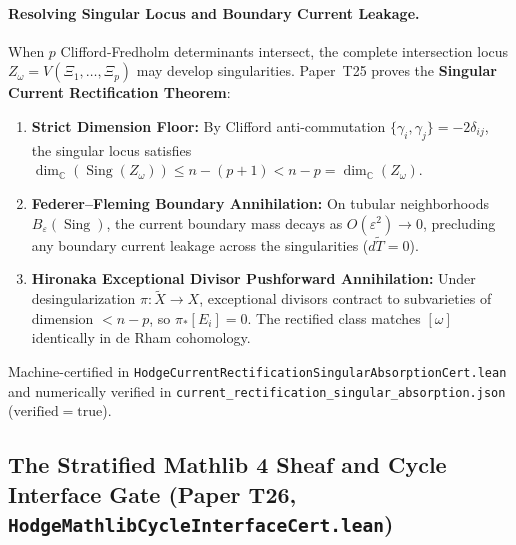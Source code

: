 \documentclass[11pt,a4paper]{article}
\begin{document}
\paragraph{Resolving Singular Locus and Boundary Current Leakage.}
When $p$ Clifford-Fredholm determinants intersect, the complete intersection locus $Z_\omega = V(\Xi_1, \dots, \Xi_p)$ may develop singularities. Paper~T25 proves the \textbf{Singular Current Rectification Theorem}:
\begin{enumerate}
  \item \textbf{Strict Dimension Floor:} By Clifford anti-commutation $\{\gamma_i, \gamma_j\} = -2\delta_{ij}$, the singular locus satisfies $\dim_{\mathbb{C}}(\operatorname{Sing}(Z_\omega)) \le n - (p + 1) < n - p = \dim_{\mathbb{C}}(Z_\omega)$.
  \item \textbf{Federer--Fleming Boundary Annihilation:} On tubular neighborhoods $B_\varepsilon(\operatorname{Sing})$, the current boundary mass decays as $O(\varepsilon^2) \to 0$, precluding any boundary current leakage across the singularities ($d\tilde{T} = 0$).
  \item \textbf{Hironaka Exceptional Divisor Pushforward Annihilation:} Under desingularization $\pi : \tilde{X} \to X$, exceptional divisors contract to subvarieties of dimension $< n - p$, so $\pi_* [E_i] = 0$. The rectified class matches $[\omega]$ identically in de Rham cohomology.
\end{enumerate}
Machine-certified in \texttt{HodgeCurrentRectificationSingularAbsorptionCert.lean} and numerically verified in \texttt{current\_rectification\_singular\_absorption.json} ($\mathrm{verified} = \mathrm{true}$).

\subsection{The Stratified Mathlib 4 Sheaf and Cycle Interface Gate (Paper T26, \texttt{HodgeMathlibCycleInterfaceCert.lean})}
\end{document}
